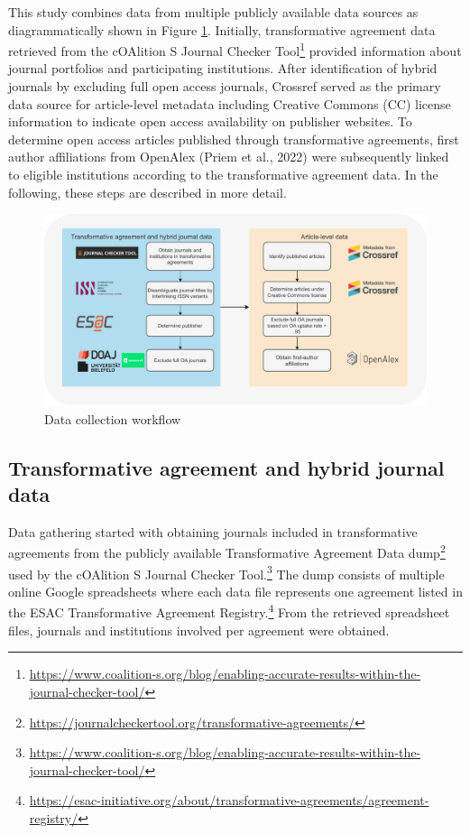 \documentclass[a4paper,man,floatsintext,longtable,noextraspace,12pt]{apa6}
\begin{document}
This study combines data from multiple publicly available data sources
as diagrammatically shown in Figure \ref{fig:data_workflow}. Initially,
transformative agreement data retrieved from the cOAlition S Journal
Checker Tool\footnote{\url{https://www.coalition-s.org/blog/enabling-accurate-results-within-the-journal-checker-tool/}}
provided information about journal portfolios and participating
institutions. After identification of hybrid journals by excluding full
open access journals, Crossref served as the primary data source for
article-level metadata including Creative Commons (CC) license
information to indicate open access availability on publisher websites.
To determine open access articles published through transformative
agreements, first author affiliations from OpenAlex (Priem et al., 2022)
were subsequently linked to eligible institutions according to the
transformative agreement data. In the following, these steps are
described in more detail.

\begin{figure}[ht!]

{\centering \includegraphics[width=0.99\linewidth,]{data_collection_workflow} 

}

\caption{Data collection workflow}\label{fig:data_workflow}
\end{figure}

\hypertarget{transformative-agreement-and-hybrid-journal-data}{%
\subsection{Transformative agreement and hybrid journal
data}\label{transformative-agreement-and-hybrid-journal-data}}

Data gathering started with obtaining journals included in
transformative agreements from the publicly available Transformative
Agreement Data dump\footnote{\url{https://journalcheckertool.org/transformative-agreements/}}
used by the cOAlition S Journal Checker Tool.\footnote{\url{https://www.coalition-s.org/blog/enabling-accurate-results-within-the-journal-checker-tool/}}
The dump consists of multiple online Google spreadsheets where each data
file represents one agreement listed in the ESAC Transformative
Agreement Registry.\footnote{\url{https://esac-initiative.org/about/transformative-agreements/agreement-registry/}}
From the retrieved spreadsheet files, journals and institutions involved
per agreement were obtained.
\end{document}
